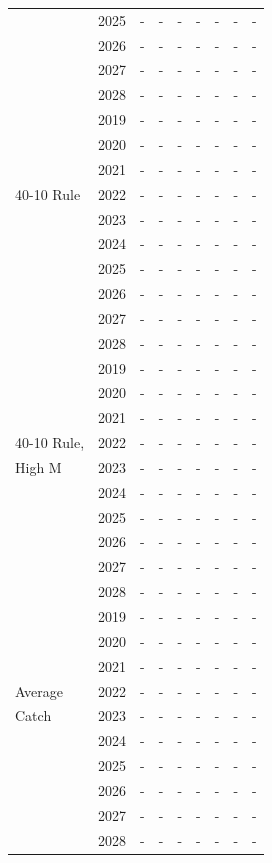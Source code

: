 \documentclass[12pt,]{article}
\begin{document}
\begin{table}[ht]
{\begin{tabular}{l|cc|>{\centering}p{.7in}c|>{\centering}p{.7in}c|>{\centering}p{.7in}c}
   & 2025 & - & - & - & - & - & - & - \\ 
   & 2026 & - & - & - & - & - & - & - \\ 
   & 2027 & - & - & - & - & - & - & - \\ 
   & 2028 & - & - & - & - & - & - & - \\ 
   \hline
 & 2019 & - & - & - & - & - & - & - \\ 
   & 2020 & - & - & - & - & - & - & - \\ 
   & 2021 & - & - & - & - & - & - & - \\ 
  40-10 Rule & 2022 & - & - & - & - & - & - & - \\ 
   & 2023 & - & - & - & - & - & - & - \\ 
   & 2024 & - & - & - & - & - & - & - \\ 
   & 2025 & - & - & - & - & - & - & - \\ 
   & 2026 & - & - & - & - & - & - & - \\ 
   & 2027 & - & - & - & - & - & - & - \\ 
   & 2028 & - & - & - & - & - & - & - \\ 
   \hline
 & 2019 & - & - & - & - & - & - & - \\ 
   & 2020 & - & - & - & - & - & - & - \\ 
   & 2021 & - & - & - & - & - & - & - \\ 
  40-10 Rule, & 2022 & - & - & - & - & - & - & - \\ 
  High M & 2023 & - & - & - & - & - & - & - \\ 
   & 2024 & - & - & - & - & - & - & - \\ 
   & 2025 & - & - & - & - & - & - & - \\ 
   & 2026 & - & - & - & - & - & - & - \\ 
   & 2027 & - & - & - & - & - & - & - \\ 
   & 2028 & - & - & - & - & - & - & - \\ 
   \hline
 & 2019 & - & - & - & - & - & - & - \\ 
   & 2020 & - & - & - & - & - & - & - \\ 
   & 2021 & - & - & - & - & - & - & - \\ 
  Average & 2022 & - & - & - & - & - & - & - \\ 
  Catch & 2023 & - & - & - & - & - & - & - \\ 
   & 2024 & - & - & - & - & - & - & - \\ 
   & 2025 & - & - & - & - & - & - & - \\ 
   & 2026 & - & - & - & - & - & - & - \\ 
   & 2027 & - & - & - & - & - & - & - \\ 
   & 2028 & - & - & - & - & - & - & - \\ 
   \hline
\end{tabular}
}
\end{table}
\end{document}
